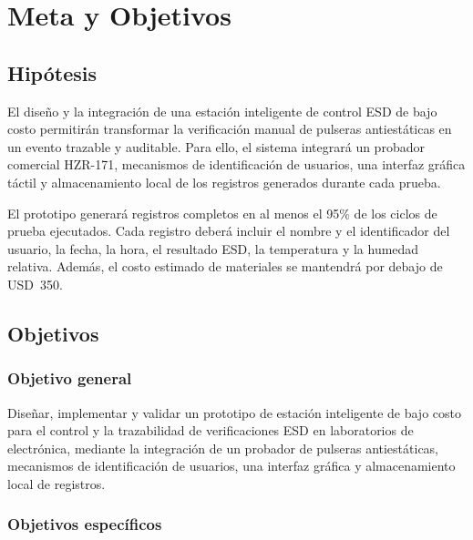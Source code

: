 \chapter{Meta y Objetivos}

\section{Hipótesis}

El diseño y la integración de una estación inteligente de control ESD de bajo
costo permitirán transformar la verificación manual de pulseras antiestáticas en
un evento trazable y auditable. Para ello, el sistema integrará un probador
comercial HZR-171, mecanismos de identificación de usuarios, una interfaz
gráfica táctil y almacenamiento local de los registros generados durante cada
prueba.

El prototipo generará registros completos en al menos el 95\% de los ciclos de
prueba ejecutados. Cada registro deberá incluir el nombre y el identificador del
usuario, la fecha, la hora, el resultado ESD, la temperatura y la humedad relativa.
Además, el costo estimado de materiales se mantendrá por debajo de USD~350.

\section{Objetivos}

\subsection{Objetivo general}

Diseñar, implementar y validar un prototipo de estación inteligente de bajo
costo para el control y la trazabilidad de verificaciones ESD en laboratorios de
electrónica, mediante la integración de un probador de pulseras antiestáticas,
mecanismos de identificación de usuarios, una interfaz gráfica y almacenamiento
local de registros.

\subsection{Objetivos específicos}

